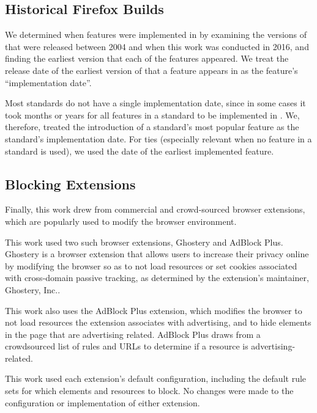 \subsection{Historical Firefox Builds}
We determined when features were implemented in \FF by
examining the \numfirefoxes versions of \FF that were released between 2004
and when this work was conducted in 2016, and finding the earliest version
that each of the \numfeatures features appeared.
We treat the release date of the earliest version of
\FF that a feature appears in as the feature's ``implementation date''.

Most standards do not have a single implementation date, since in some cases
it took months or years for all features in a standard to be
implemented in \FF.  We, therefore, treated the introduction of a standard's
most popular feature as the standard's implementation date. For ties
(especially relevant when no feature in a standard is used), we
used the date of the earliest implemented feature.


\subsection{Blocking Extensions}
\label{measurement:data-sources:data-extensions}
Finally, this work drew from commercial and crowd-sourced browser extensions,
which are popularly used to modify the browser environment.

This work used two such browser extensions, Ghostery and AdBlock Plus.
Ghostery is a browser extension that allows users to increase their privacy
online by modifying the browser so as to not load resources or set cookies
associated with cross-domain passive tracking, as determined by the extension's
maintainer, Ghostery, Inc..

This work also uses the AdBlock Plus extension, which modifies
the browser to not load resources the extension associates with
advertising, and to hide elements in the page that are advertising related.
AdBlock Plus draws from a crowdsourced list of rules and URLs to determine
if a resource is advertising-related.

This work used each extension's default configuration, including the default
rule sets for which elements and resources to block.  No changes were made to
the configuration or implementation of either extension.
